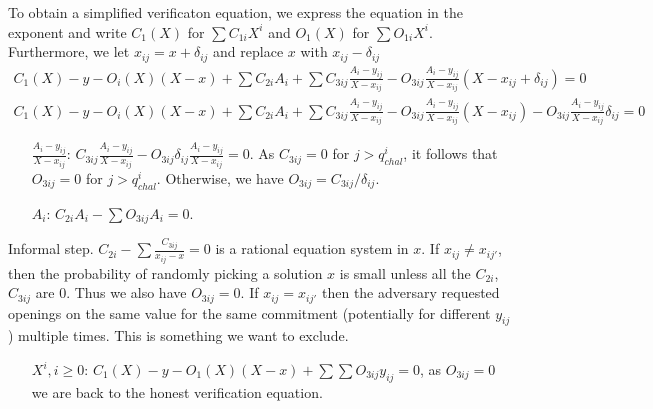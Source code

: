 \documentclass[runningheads,11pt]{llncs}
\begin{document}
To obtain a simplified verificaton equation, we express the equation in the exponent and write $C_{1}(X)$ for $\sum C_{1i} X^{i}$ and  $O_{1}(X)$ for $\sum O_{1i} X^{i}$.
Furthermore, we let $x_{ij}= x+\delta_{ij}$ and replace $x$ with $x_{ij}-\delta_{ij}$
\begin{align*}
C_{1}(X) - y - O_{i}(X)(X-x) + \sum C_{2i} A_{i} + \sum C_{3ij} \frac{A_{i}-y_{ij}}{X-x_{ij}} - O_{3ij} \frac{A_{i}-y_{ij}}{X-x_{ij}} (X-x_{ij}+\delta_{ij}) = 0\\
C_{1}(X) - y - O_{i}(X)(X-x) + \sum C_{2i} A_{i} + \sum C_{3ij} \frac{A_{i}-y_{ij}}{X-x_{ij}} - O_{3ij} \frac{A_{i}-y_{ij}}{X-x_{ij}} (X-x_{ij}) - O_{3ij} \frac{A_{i}-y_{ij}}{X-x_{ij}} \delta_{ij} = 0
       \end{align*}

\begin{itemize}
  \item[$\frac{A_{i}-y_{ij}}{X-x_{ij}}$:] $C_{3ij} \frac{A_{i}-y_{ij}}{X-x_{ij}} - O_{{3ij}}\delta_{ij} \frac{A_{i}-y_{ij}}{X-x_{ij}}=0$. As
    $C_{3ij}=0$ for $j>q^{i}_{chal}$, it follows that $O_{{3ij}}=0$ for $j>q^{i}_{chal}$. Otherwise, we have $O_{3ij}= C_{3ij}/\delta_{ij}$.
  \item[$A_{i}$:] $C_{2i} A_{i} - \sum O_{3ij} A_{i}=0$.
\end{itemize}

Informal step. $C_{2i}- \sum \frac{C_{3ij}}{x_{ij}-x} =0$ is a rational equation system in $x$. If $x_{ij}\neq x_{ij'}$, then the probability of randomly picking a solution $x$ is small unless all the $C_{2i}$, $C_{3ij}$ are $0$. Thus we also have $O_{{3ij}}=0$.
If $x_{ij} = x_{ij'}$ then the adversary requested openings on the same value for the same commitment (potentially for different $y_{ij}$) multiple times. This is something we want to exclude.

\begin{itemize}
        \item[$X^{i}, i\geq 0$:] $C_{1}(X) - y - O_{1}(X)(X-x) + \sum \sum O_{3ij} y_{ij} = 0$, as $O_{3ij}=0$ we are back to the honest verification equation.
\end{itemize}
\end{document}
